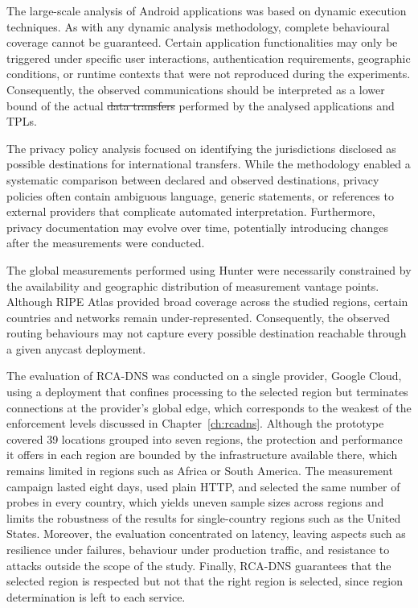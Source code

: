 \documentclass[
A4paper,                %
twoside,                %
openright,              %
chapterprefix=true,     %
12pt,                   %
headings=normal,        %
titlepage=on            %
]{book}
\makeatletter
\providecommand{\DIFaddtex}[1]{{\protect\color{blue}\uwave{#1}}} %
\providecommand{\DIFdeltex}[1]{{\protect\color{red}\sout{#1}}} %
\providecommand{\DIFaddbegin}{} %
\providecommand{\DIFaddend}{} %
\providecommand{\DIFdelbegin}{} %
\providecommand{\DIFdelend}{} %
\providecommand{\DIFadd}[1]{\texorpdfstring{\DIFaddtex{#1}}{#1}} %
\providecommand{\DIFdel}[1]{\texorpdfstring{\DIFdeltex{#1}}{}} %
\providecommand{\DIFscaledelfig}{0.5}
\newlength{\DIFdelgraphicswidth} %
\newlength{\DIFdelgraphicsheight} %
\providecommand{\DIFaddincludegraphics}[2][]{{\color{blue}\fbox{\DIFOincludegraphics[#1]{#2}}}} %
\providecommand{\DIFdelincludegraphics}[2][]{%
\sbox{\DIFdelgraphicsbox}{\DIFOincludegraphics[#1]{#2}}%
\settoboxwidth{\DIFdelgraphicswidth}{\DIFdelgraphicsbox} %
\settoboxtotalheight{\DIFdelgraphicsheight}{\DIFdelgraphicsbox} %
\scalebox{\DIFscaledelfig}{%
\parbox[b]{\DIFdelgraphicswidth}{\usebox{\DIFdelgraphicsbox}\\[-\baselineskip] \rule{\DIFdelgraphicswidth}{0em}}\llap{\resizebox{\DIFdelgraphicswidth}{\DIFdelgraphicsheight}{%
\setlength{\unitlength}{\DIFdelgraphicswidth}%
\begin{picture}(1,1)%
\thicklines\linethickness{2pt} %
{\color[rgb]{1,0,0}\put(0,0){\framebox(1,1){}}}%
{\color[rgb]{1,0,0}\put(0,0){\line( 1,1){1}}}%
{\color[rgb]{1,0,0}\put(0,1){\line(1,-1){1}}}%
\end{picture}%
}\hspace*{3pt}}} %
} %
\DeclareRobustCommand{\DIFaddbegin}{\DIFOaddbegin \let\includegraphics\DIFaddincludegraphics} %
\DeclareRobustCommand{\DIFaddend}{\DIFOaddend \let\includegraphics\DIFOincludegraphics} %
\DeclareRobustCommand{\DIFdelbegin}{\DIFOdelbegin \let\includegraphics\DIFdelincludegraphics} %
\DeclareRobustCommand{\DIFdelend}{\DIFOaddend \let\includegraphics\DIFOincludegraphics} %
\let\sout@orig\sout %
\renewcommand{\sout}[1]{\ifmmode\text{\sout@orig{\ensuremath{#1}}}\else\sout@orig{#1}\fi} %
\makeatother
\begin{document}
\DIFaddend The large-scale analysis of Android applications was based on dynamic execution techniques. As with any dynamic analysis methodology, complete behavioural coverage cannot be guaranteed. Certain application functionalities may only be triggered under specific user interactions, authentication requirements, geographic conditions, or runtime contexts that were not reproduced during the experiments. Consequently, the observed communications should be interpreted as a lower bound of the actual \DIFdelbegin \DIFdel{data transfers }\DIFdelend \DIFaddbegin \DIFadd{communications }\DIFaddend performed by the analysed applications and TPLs.

The privacy policy analysis focused on identifying the jurisdictions disclosed as possible destinations for international transfers. While the methodology enabled a systematic comparison between declared and observed destinations, privacy policies often contain ambiguous language, generic statements, or references to external providers that complicate automated interpretation. Furthermore, privacy documentation may evolve over time, potentially introducing changes after the measurements were conducted.

The global measurements performed using Hunter were necessarily constrained by the availability and geographic distribution of measurement vantage points. Although RIPE Atlas provided broad coverage across the studied regions, certain countries and networks remain under-represented. Consequently, the observed routing behaviours may not capture every possible destination reachable through a given anycast deployment.

The evaluation of RCA-DNS was conducted on a single provider, Google Cloud, using a deployment that confines processing to the selected region but terminates connections at the provider's global edge, which corresponds to the weakest of the enforcement levels discussed in Chapter~\ref{ch:rcadns}. Although the prototype covered 39 locations grouped into seven regions, the protection and performance it offers in each region are bounded by the infrastructure available there, which remains limited in regions such as Africa or South America. The measurement campaign lasted eight days, used plain HTTP, and selected the same number of probes in every country, which yields uneven sample sizes across regions and limits the robustness of the results for single-country regions such as the United States. Moreover, the evaluation concentrated on latency, leaving aspects such as resilience under failures, behaviour under production traffic, and resistance to attacks outside the scope of the study. Finally, RCA-DNS guarantees that the selected region is respected but not that the right region is selected, since region determination is left to each service.
\end{document}
